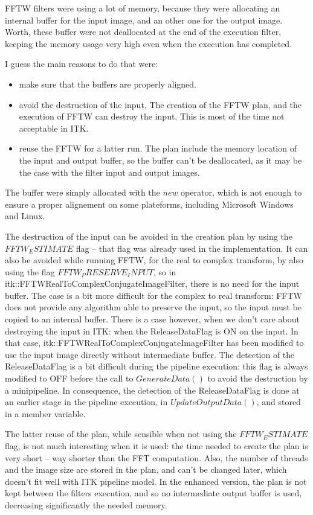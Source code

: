 \documentclass{InsightArticle}
\begin{document}
FFTW filters were using a lot of memory, because they were allocating an internal buffer for the input 
image, and an other one for the output image. Worth, these buffer were not deallocated at the end of
the execution filter, keeping the memory usage very high even when the execution has completed.

I guess the main reasons to do that were:
\begin{itemize}
  \item make sure that the buffers are properly aligned.
  \item avoid the destruction of the input. The creation of the FFTW plan, and the execution of FFTW 
  can destroy the input. This is most of the time not acceptable in ITK.
  \item reuse the FFTW for a latter run. The plan include the memory location of the input and output
  buffer, so the buffer can't be deallocated, as it may be the case with the filter input and output images.
\end{itemize}

The buffer were simply allocated with the $new$ operator, which is not enough to ensure a proper alignement
on some plateforms, including Microsoft Windows and Linux.

The destruction of the input can be avoided in the creation plan by using the $FFTW_ESTIMATE$ flag
-- that flag was already used in the implementation. It can also be avoided while running FFTW, for 
the real to complex transform, by also using the flag $FFTW_PRESERVE_INPUT$, so in 
itk::FFTWRealToComplexConjugateImageFilter, there is no need for the input buffer. The case is a bit
more difficult for the complex to real transform: FFTW does not provide any algorithm able to preserve
the input, so the input must be copied to an internal buffer. There is a case however, when we don't
care about destroying the input in ITK: when the ReleaseDataFlag is ON on the input. In that case, 
itk::FFTWRealToComplexConjugateImageFilter has been modified to use the input image directly without 
intermediate buffer. The detection of the ReleaseDataFlag is a bit difficult during the pipeline 
execution: this flag is always modified to OFF before the call to $GenerateData()$ to avoid the 
destruction by a minipipeline. In consequence, the detection of the ReleaseDataFlag is done at an 
earlier stage in the pipeline execution, in $UpdateOutputData()$, and stored in a member variable.

The latter reuse of the plan, while sensible when not using the $FFTW_ESTIMATE$ flag, is not much 
interesting when it is used: the time needed to create the plan is very short -- way shorter than the
FFT computation. Also, the number of threads and the image size are stored in the plan, and can't be 
changed later, which doesn't fit well with ITK pipeline model. In the enhanced version, the plan is
not kept between the filters execution, and so no intermediate output buffer is used, decreasing 
significantly the needed memory.
\end{document}
